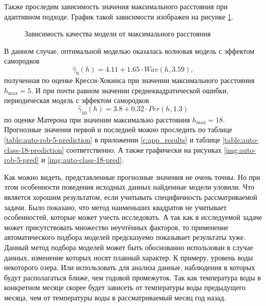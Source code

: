 Также проследим зависимость значения максимального расстояния при адаптивном подходе. График такой зависимости изображен на рисунке \ref{img:auto-mse-cutoff}.
\begin{figure}[ht]
\caption{Зависимость качества модели от максимального расстояния}
\label{img:auto-mse-cutoff}
\end{figure}
В данном случае, оптимальной моделью оказалась волновая модель с эффектом самородков
\begin{equation*}
 	\widehat{\gamma}_9(h) = 4.11 + 1.65 \cdot Wav(h, 3.59),
\end{equation*}
полученная по оценке Кресси-Хокинса при значении максимального расстояния $ h_{\text{max}} = 5 $. И при почти равном значении среднеквадратической ошибки, периодическая модель с эффектом самородков
\begin{equation*}
 	\widehat{\gamma}_{10}(h) = 3.8 + 0.32 \cdot Per(h, 1.3)
\end{equation*}
по оценке Матерона при значении максимально расстояния $ h_{\text{max}} = 18 $. Прогнозные значения первой и последней можно проследить по таблице \ref{table:auto-rob-5-prediction} в приложении \ref{c:app_results} и таблице \ref{table:auto-class-18-prediction} соответственно. А также графически на рисунках \ref{img:auto-rob-5-pred} и \ref{img:auto-class-18-pred}.


Как можно видеть, представленные прогнозные значения не очень точны. Но при этом особенности поведения исходных данных найденные модели уловили. Что является хорошим результатом, если учитывать специфичность рассматриваемой задачи. Было показано, что метод наименьших квадратов не учитывает особенностей, которые может учесть исследовать. А так как в исследуемой задаче может присутствовать множество неучтённых факторов, то применение автоматического подбора моделей предсказуемо показывает результаты хуже. Данный метод подбора моделей может быть обоснованно использован в случае данных, изменение которых носят плавный характер. К примеру, уровень воды некоторого озера. Или использовать для анализа данные, наблюдения в которых будут располагаться ближе, чем годовой промежуток. Так как температура воды в конкретном месяце скорее будет зависеть от температуры воды предыдущего месяца, чем от температуры воды в рассматриваемый месяц год назад.

